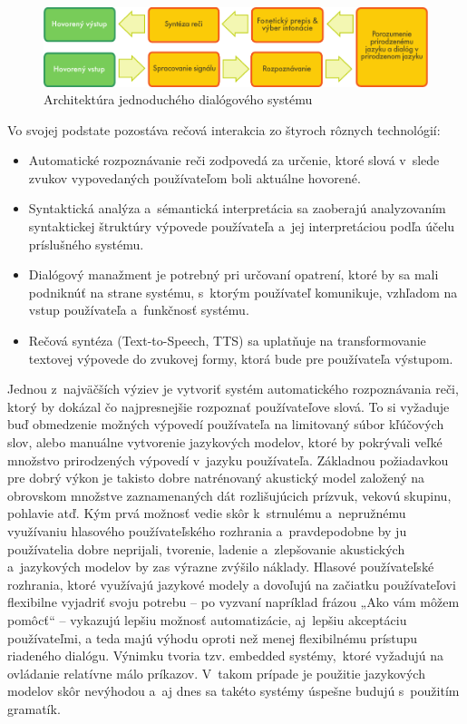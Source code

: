 \begin{multicols}{2}
\begin{figure}[htb]
  \center
  \includegraphics[width=\textwidth]{../_media/slovak/simple_speech-based_dialogue_architecture}
  \caption{Architektúra jednoduchého dialógového systému}
  \label{fig:dialoguearch_sk}
\end{figure}

Vo svojej podstate pozostáva rečová interakcia zo štyroch rôznych technológií:

\begin{itemize}
\item Automatické rozpoznávanie reči zodpovedá za určenie, ktoré slová v~slede zvukov vypovedaných používateľom boli aktuálne hovorené.
\item Syntaktická analýza a~sémantická interpretácia sa zaoberajú analyzovaním syntaktickej štruktúry výpovede používateľa a~jej interpretáciou podľa účelu príslušného systému.
\item Dialógový manažment je potrebný pri určovaní opatrení, ktoré by sa mali podniknúť na strane systému, s~ktorým používateľ komunikuje, vzhľadom na vstup používateľa a~funkčnosť systému.
\item Rečová syntéza (Text-to-Speech, TTS) sa uplatňuje na transformovanie textovej výpovede do zvukovej formy, ktorá bude pre používateľa výstupom.
\end{itemize}

Jednou z~najväčších výziev je vytvoriť systém automatického
rozpoznávania reči, ktorý by dokázal čo najpresnejšie rozpoznať
používateľove slová. To si vyžaduje buď obmedzenie možných
výpovedí používateľa na limitovaný súbor kľúčových slov,
alebo manuálne vytvorenie jazykových modelov, ktoré by pokrývali
veľké množstvo prirodzených výpovedí v~jazyku používateľa.
Základnou požiadavkou pre dobrý výkon je takisto dobre natrénovaný
akustický model založený na obrovskom množstve zaznamenaných dát
rozlišujúcich prízvuk, vekovú skupinu, pohlavie atď. Kým prvá
možnosť vedie skôr k~strnulému a~nepružnému využívaniu
hlasového používateľského rozhrania a~pravdepodobne by ju
používatelia dobre neprijali, tvorenie, ladenie a~zlepšovanie
akustických a~jazykových modelov by zas výrazne zvýšilo náklady.
Hlasové používateľské rozhrania, ktoré využívajú jazykové
modely a dovoľujú na začiatku používateľovi flexibilne vyjadriť
svoju potrebu -- po vyzvaní napríklad frázou „Ako vám môžem
pomôcť“ -- vykazujú lepšiu možnosť automatizácie,
aj~lepšiu akceptáciu používateľmi, a teda majú výhodu oproti
než menej flexibilnému prístupu riadeného dialógu. Výnimku tvoria
tzv. embedded systémy,~ktoré vyžadujú na ovládanie relatívne málo
príkazov. V~takom prípade je použitie jazykových modelov
skôr nevýhodou a~aj dnes sa takéto systémy úspešne budujú
s~použitím gramatík.


\end{multicols}
